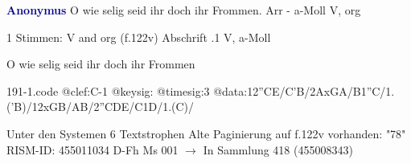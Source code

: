 \documentclass[twocolumn]{book}
\begin{document}
\newline \par \vspace{7pt} \textcolor{darkblue}{\textbf{Anonymus  }}
\newline O wie selig seid ihr doch ihr Frommen. Arr - a-Moll
\newline V, org
\newline \begin{itshape}\end{itshape} 
\newline \textcolor{darkblue}{}  1 Stimmen: V and org  (f.122v)
\newline Abschrift
.1  V, a-Moll
\newline \begin{footnotesize} O wie selig seid ihr doch ihr Frommen \end{footnotesize}  
\begin{filecontents*}{191-1.code}
@clef:C-1
@keysig:
@timesig:3
@data:12''CE/C'B/2AxGA/B1''C/1.('B)/12xGB/AB/2''CDE/C1D/1.(C)/
\end{filecontents*}
\newline
%
\newline Unter den Systemen 6 Textstrophen
\newline Alte Paginierung auf f.122v vorhanden: "78"
\newline RISM-ID: 455011034
\newline D-Fh  Ms 001
\newline $\rightarrow$ In Sammlung 418 (455008343)
      
\end{document}
